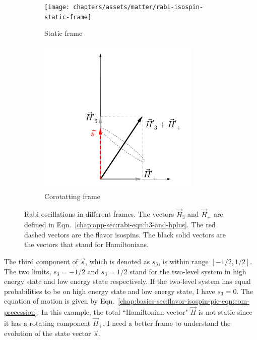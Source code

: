 \begin{figure}[htbp]
	\centering
	\begin{subfigure}[t]{0.5\textwidth}
		\centering
		\texttt{[image: chapters/assets/matter/rabi-isospin-static-frame]}
		\caption{Static frame}\label{chap:app-sec:rabi-fig:rabi-static-frame}
	\end{subfigure}%
	\begin{subfigure}[t]{0.5\textwidth}
		\centering
		\includegraphics[width=0.85\textwidth]{chapters/assets/matter/rabi-isospin-rotating-frame}
		\caption{Corotatting frame}\label{chap:app-sec:rabi-fig:rabi-rotating-frame}
	\end{subfigure}
	\caption{
  Rabi oscillations in different frames. The vectors $\vec H_3$ and $\vec H_+$ are defined in Eqn.~\ref{chap:app-sec:rabi-eqn:h3-and-hplus}. The red dashed vectors are the flavor isospins. The black solid vectors are the vectors that stand for Hamiltonians.
  }\label{chap:app-sec:rabi-fig:rabi-frames}
\end{figure}


The third component of $\vec{s}$, which is denoted as $s_3$, is within range $[-1/2,1/2]$. The two limits, $s_3=-1/2$ and $s_3=1/2$ stand for the two-level system in high energy state and low energy state respectively. If the two-level system has equal probabilities to be on high energy state and low energy state, I have $s_3=0$. The equation of motion is given by Eqn.~\ref{chap:basics-sec:flavor-isospin-pic-eqn:eom-precession}. In this example, the total ``Hamiltonian vector" $\vec H$ is not static since it has a rotating component $\vec H_+$. I need a better frame to understand the evolution of the state vector $\vec s$.

